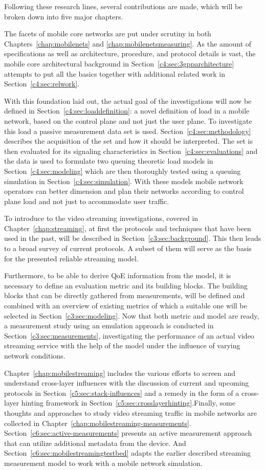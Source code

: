 Following these research lines, several contributions are made, which will be broken down into five major chapters.


The facets of mobile core networks are put under scrutiny in both Chapters~\ref{chap:mobilenets} and \ref{chap:mobilenetsmeasuring}. As the amount of specifications as well as architecture, procedure, and protocol details is vast, the mobile core architectural background in Section~\ref{c4:sec:3gpparchitecture} attempts to put all the basics together with additional related work in Section~\ref{c4:sec:relwork}.

With this foundation laid out, the actual goal of the investigations will now be defined in Section~\ref{c4:sec:loaddefinition}: a novel definition of load in a mobile network, based on the control plane and not just the user plane. To investigate this load a passive measurement data set is used. Section~\ref{c4:sec:methodology} describes the acquisition of the set and how it should be interpreted. The set is then evaluated for its signaling characteristics in Section~\ref{c4:sec:evaluations} and the data is used to formulate two queuing theoretic load models in Section~\ref{c4:sec:modeling} which are then thoroughly  tested using a queuing simulation in Section~\ref{c4:sec:simulation}. With these models mobile network operators can better dimension and plan their networks according to control plane load and not just to accommodate user traffic.


To introduce to the video streaming investigations, covered in Chapter~\ref{chap:streaming}, at first the protocols and techniques that have been used in the past, will be described in Section~\ref{c3:sec:background}. This then leads to a broad survey of current protocols. A subset of them will serve as the basis for the presented reliable streaming model. 

Furthermore, to be able to derive \gls{QoE} information from the model, it is necessary to define an evaluation metric and its building blocks. The building blocks that can be directly gathered from measurements, will be defined and combined with an overview of existing metrics of which a suitable one will be selected in Section~\ref{c3:sec:modeling}. Now that both metric and model are ready, a measurement study using an emulation approach is conducted in Section~\ref{c3:sec:measurements}, investigating the performance of an actual video streaming service with the help of the model under the influence of varying network conditions.


Chapter~\ref{chap:mobilestreaming} includes the various efforts to screen and understand cross-layer influences with the discussion of current and upcoming protocols in Section~\ref{c5:sec:stack-influences} and a remedy in the form of a cross-layer hinting framework in Section~\ref{c5:sec:crosslayerhinting}.Finally, some thoughts and approaches to study video streaming traffic in mobile networks are collected in Chapter~\ref{chap:mobilestreaming-measurements}. Section~\ref{c6:sec:active-measurements} presents an active measurement approach that can utilize additional metadata from the device. And Section~\ref{c6:sec:mobilestreamingtestbed} adapts the earlier described streaming measurement model to work with a mobile network simulation.

